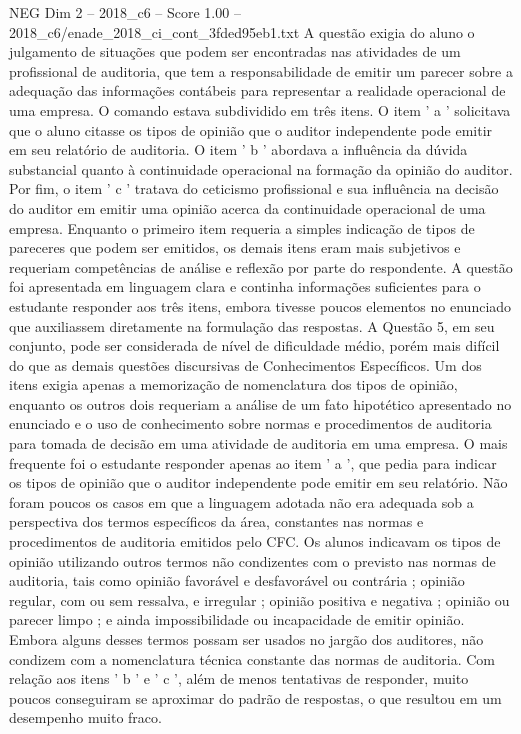 \begin{textsample}{NEG Dim 2 – 2018\_c6 – Score 1.00 – 2018\_c6/enade\_2018\_ci\_cont\_3fded95eb1.txt}
A questão exigia do aluno o julgamento de situações que podem ser encontradas nas atividades de um profissional de auditoria, que tem a responsabilidade de emitir um parecer sobre a adequação das informações contábeis para representar a realidade operacional de uma empresa.
O comando estava subdividido em três itens.
O item ' a ' solicitava que o aluno citasse os tipos de opinião que o auditor independente pode emitir em seu relatório de auditoria.
O item ' b ' abordava a influência da dúvida substancial quanto à continuidade operacional na formação da opinião do auditor.
Por fim, o item ' c ' tratava do ceticismo profissional e sua influência na decisão do auditor em emitir uma opinião acerca da continuidade operacional de uma empresa.
Enquanto o primeiro item requeria a simples indicação de tipos de pareceres que podem ser emitidos, os demais itens eram mais subjetivos e requeriam competências de análise e reflexão por parte do respondente.
A questão foi apresentada em linguagem clara e continha informações suficientes para o estudante responder aos três itens, embora tivesse poucos elementos no enunciado que auxiliassem diretamente na formulação das respostas.
A Questão 5, em seu conjunto, pode ser considerada de nível de dificuldade médio, porém mais difícil do que as demais questões discursivas de Conhecimentos Específicos.
Um dos itens exigia apenas a memorização de nomenclatura dos tipos de opinião, enquanto os outros dois requeriam a análise de um fato hipotético apresentado no enunciado e o uso de conhecimento sobre normas e procedimentos de auditoria para tomada de decisão em uma atividade de auditoria em uma empresa.
O mais frequente foi o estudante responder apenas ao item ' a ', que pedia para indicar os tipos de opinião que o auditor independente pode emitir em seu relatório.
Não foram poucos os casos em que a linguagem adotada não era adequada sob a perspectiva dos termos específicos da área, constantes nas normas e procedimentos de auditoria emitidos pelo CFC.
Os alunos indicavam os tipos de opinião utilizando outros termos não condizentes com o previsto nas normas de auditoria, tais como opinião favorável e desfavorável ou contrária ; opinião regular, com ou sem ressalva, e irregular ; opinião positiva e negativa ; opinião ou parecer limpo ; e ainda impossibilidade ou incapacidade de emitir opinião.
Embora alguns desses termos possam ser usados no jargão dos auditores, não condizem com a nomenclatura técnica constante das normas de auditoria.
Com relação aos itens ' b ' e ' c ', além de menos tentativas de responder, muito poucos conseguiram se aproximar do padrão de respostas, o que resultou em um desempenho muito fraco.

\end{textsample}
